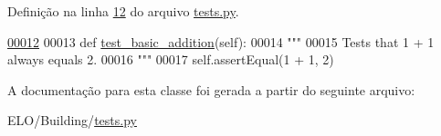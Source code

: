 Definição na linha \hyperlink{tests_8py_source_l00012}{12} do arquivo \hyperlink{tests_8py_source}{tests.\-py}.


\begin{DoxyCode}
\hypertarget{classBuilding_1_1tests_1_1SimpleTest_l00012}{}\hyperlink{classBuilding_1_1tests_1_1SimpleTest_ab0e4899c8d53d334ffdff4c5e40e2962}{00012} 
00013     \textcolor{keyword}{def }\hyperlink{classBuilding_1_1tests_1_1SimpleTest_ab0e4899c8d53d334ffdff4c5e40e2962}{test\_basic\_addition}(self):
00014         \textcolor{stringliteral}{"""}
00015 \textcolor{stringliteral}{        Tests that 1 + 1 always equals 2.}
00016 \textcolor{stringliteral}{        """}
00017         self.assertEqual(1 + 1, 2)
\end{DoxyCode}


A documentação para esta classe foi gerada a partir do seguinte arquivo\-:\begin{DoxyCompactItemize}
\item 
E\-L\-O/\-Building/\hyperlink{tests_8py}{tests.\-py}\end{DoxyCompactItemize}
